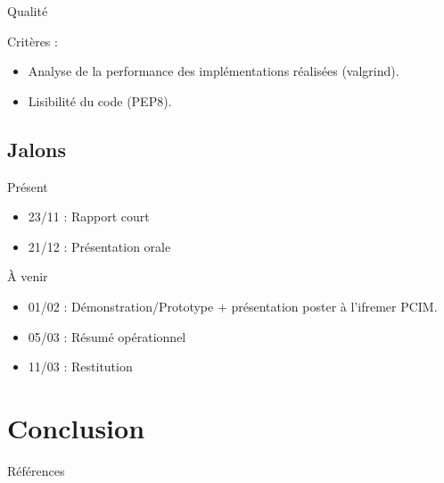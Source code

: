 \documentclass{beamer}
\begin{document}
\begin{frame}{Qualité}

  Critères :
  \begin{itemize}
  \item Analyse de la performance des implémentations réalisées
    (valgrind).
  \item Lisibilité du code (PEP8\cite{Pep8}).
  \end{itemize}

\end{frame}

\subsection{Jalons}

\begin{frame}{Présent}

  \begin{itemize}
  \item 23/11 : Rapport court
  \item 21/12 : Présentation orale
  \end{itemize}

\end{frame}

\begin{frame}{À venir}

  \begin{itemize}
  \item 01/02 : Démonstration/Prototype + présentation poster à
    l'ifremer PCIM.
  \item 05/03 : Résumé opérationnel
  \item 11/03 : Restitution
  \end{itemize}

\end{frame}

\section{Conclusion}

\begin{frame}{Références}

  
  

\end{frame}
\end{document}
